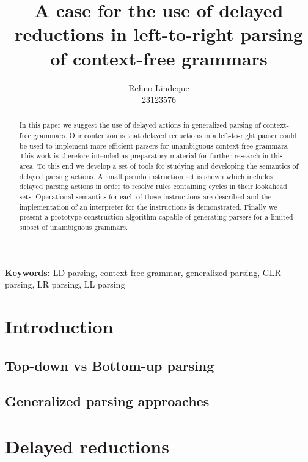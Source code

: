 \documentclass[11pt]{article}
\begin{document}
\title{A case for the use of delayed reductions in left-to-right parsing of context-free grammars}
\author{Rehno Lindeque
\\23123576}

\maketitle

\begin{abstract}
In this paper we suggest the use of delayed actions in generalized parsing of context-free grammars. 
Our contention is that delayed reductions in a left-to-right parser could be used to implement more efficient parsers for unambiguous context-free grammars. 
This work is therefore intended as preparatory material for further research in this area. 
To this end we develop a set of tools for studying and developing the semantics of delayed parsing actions.
A small pseudo instruction set is shown which includes delayed parsing actions in order to resolve rules containing cycles in their lookahead sets.
Operational semantics for each of these instructions are described and the implementation of an interpreter for the instructions is demonstrated.
Finally we present a prototype construction algorithm capable of generating parsers for a limited subset of unambiguous grammars.\\
\end{abstract}

\textbf{Keywords:} LD parsing, context-free grammar, generalized parsing, GLR parsing, LR parsing, LL parsing

\section{Introduction}

\subsection{Top-down vs Bottom-up parsing}


\subsection{Generalized parsing approaches}

\section{Delayed reductions}
\end{document}
